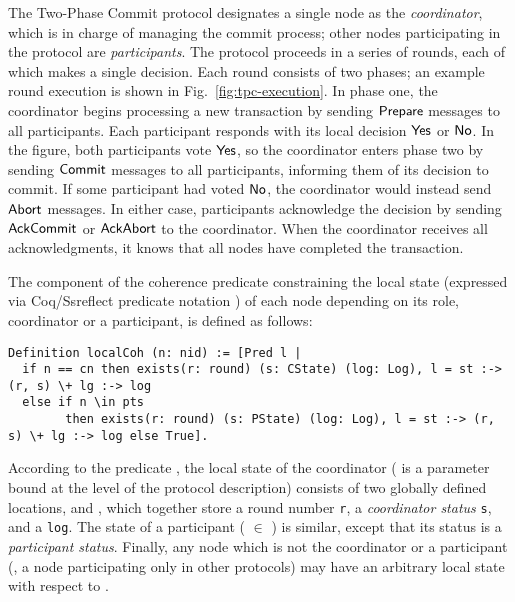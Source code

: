 The Two-Phase Commit protocol designates a single node as the
\emph{coordinator}, which is in charge of managing the commit process;
other nodes participating in the protocol are \emph{participants}.
%
The protocol proceeds in a series of rounds, each of which makes a
single decision.
%
Each round consists of two phases; an example round execution is
shown in Fig.~\ref{fig:tpc-execution}.
%
In phase one, the coordinator begins processing a new transaction by sending
$\mathsf{Prepare}$ messages to all participants.
%
Each participant responds with its local decision $\mathsf{Yes}$ or $\mathsf{No}$.
%
In the figure, both participants vote $\mathsf{Yes}$, so the coordinator
enters phase two by sending $\mathsf{Commit}$ messages to all participants,
informing them of its decision to commit.
%
If some participant had voted $\mathsf{No}$, the coordinator would instead
send $\mathsf{Abort}$ messages.
%
In either case, participants acknowledge the decision by sending
$\mathsf{AckCommit}$ or $\mathsf{AckAbort}$ to the coordinator.
%
When the coordinator receives all acknowledgments, it knows that all
nodes have completed the transaction.

The component of the coherence predicate constraining the local state
 (expressed via Coq/Ssreflect predicate notation \code{[Pred l
  | ...]}) of each node  depending on its role, coordinator or
a participant, is defined as follows:


\begin{lstlisting}[basicstyle=\footnotesize\ttfamily]
Definition localCoh (n: nid) := [Pred l |
  if n == cn then exists(r: round) (s: CState) (log: Log), l = st :-> (r, s) \+ lg :-> log
  else if n \in pts
        then exists(r: round) (s: PState) (log: Log), l = st :-> (r, s) \+ lg :-> log else True].
\end{lstlisting}
%
%
According to the predicate , the local state of the
coordinator ( is a parameter bound at the level of the
protocol description) consists of two globally defined locations,
 and , which together store a round number
\texttt{r}, a \emph{coordinator status} \texttt{s}, and a
\texttt{log}.
%
The state of a participant ( $\in$ ) is similar, except
that its status is a \emph{participant status}.
%
Finally, any node which is not the coordinator or a participant (\eg,
a node participating only in other protocols) may have an arbitrary
local state with respect to .

